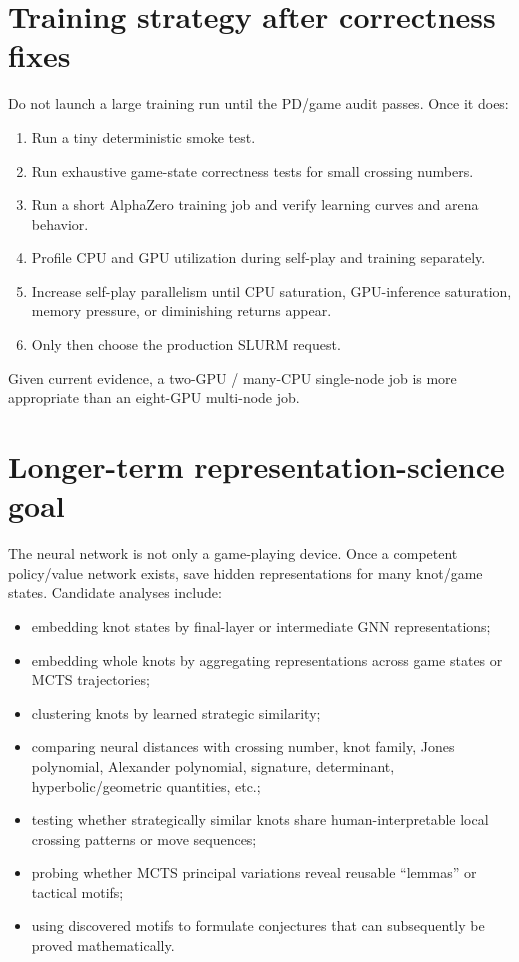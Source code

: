 \documentclass[11pt]{article}
\begin{document}
\section{Training strategy after correctness fixes}

Do not launch a large training run until the PD/game audit passes. Once it does:

\begin{enumerate}[label=\arabic*.]
    \item Run a tiny deterministic smoke test.
    \item Run exhaustive game-state correctness tests for small crossing numbers.
    \item Run a short AlphaZero training job and verify learning curves and arena behavior.
    \item Profile CPU and GPU utilization during self-play and training separately.
    \item Increase self-play parallelism until CPU saturation, GPU-inference saturation, memory pressure, or diminishing returns appear.
    \item Only then choose the production SLURM request.
\end{enumerate}

Given current evidence, a two-GPU / many-CPU single-node job is more appropriate than an eight-GPU multi-node job.

\section{Longer-term representation-science goal}

The neural network is not only a game-playing device. Once a competent policy/value network exists, save hidden representations for many knot/game states. Candidate analyses include:

\begin{itemize}
    \item embedding knot states by final-layer or intermediate GNN representations;
    \item embedding whole knots by aggregating representations across game states or MCTS trajectories;
    \item clustering knots by learned strategic similarity;
    \item comparing neural distances with crossing number, knot family, Jones polynomial, Alexander polynomial, signature, determinant, hyperbolic/geometric quantities, etc.;
    \item testing whether strategically similar knots share human-interpretable local crossing patterns or move sequences;
    \item probing whether MCTS principal variations reveal reusable ``lemmas'' or tactical motifs;
    \item using discovered motifs to formulate conjectures that can subsequently be proved mathematically.
\end{itemize}
\end{document}
